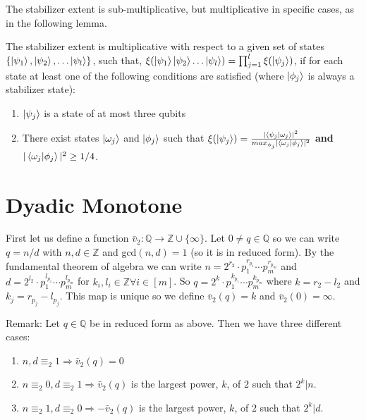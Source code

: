 \documentclass[12pt]{dalthesis}
\begin{document}
The stabilizer extent is sub-multiplicative, but multiplicative in specific cases, as in the following lemma.

\begin{lemma}
\label{stabextent}
The stabilizer extent is multiplicative with respect to a given set of states $\{ \ket{\psi_1}, \ket{\psi_2}, \dots \ket{\psi_l} \}$, such that, $\xi (\ket{\psi_1}\ket{\psi_2} \dots \ket{\psi_l}) = \prod_{j=1}^l \xi (\ket{\psi_j})$, if for each state at least one of the following conditions are satisfied (where $\ket{\phi_j}$ is always a stabilizer state):
\begin{enumerate}
\item $\ket{\psi_j}$ is a state of at most three qubits
\item There exist states $\ket{\omega_j}$ and $\ket{\phi_j}$ such that $\xi (\ket{\psi_j}) = \frac{|\braket{\psi_j| \omega_j}|^2}{max_{\phi_j}|\braket{\omega_j |\phi_j}|^2}$ \textbf{and} $|\braket{\omega_j | \phi_j}|^2 \geq 1/4$.
\end{enumerate}
\end{lemma}

\section{Dyadic Monotone}
First let us define a function $\bar{v}_2 :\mathbb{Q} \rightarrow \mathbb{Z} \cup \{ \infty \}$. Let $0 \neq q \in \mathbb{Q}$ so we can write $q = n/d$ with $n, d \in \mathbb{Z}$ and gcd$(n, d) = 1$ (so it is in reduced form). By the fundamental theorem of algebra we can write $n = 2^{r_2} \cdot p^{r_{p_1}}_1 \cdots p^{r_{p_m}}_m$ and $d = 2^{l_2} \cdot p^{l_{p_1}}_1 \cdots p^{l_{p_m}}_m$ for $k_i, l_i \in \mathbb{Z} \forall i \in [m]$. So $q = 2^{k} \cdot p^{k_{p_1}}_1 \cdots p^{k_{p_m}}_m$ where $k = r_2 - l_2$ and $k_j = r_{p_j} - l_{p_j}$. This map is unique so we define $\bar{v}_2(q) = k$ and $\bar{v}_2(0) = \infty$.

Remark: Let $q \in \mathbb{Q}$ be in reduced form as above. Then we have three different cases:
\begin{enumerate}
\item $n, d \equiv_2 1 \Rightarrow \bar{v}_2(q)= 0$
\item $n \equiv_2 0, d \equiv_2 1 \Rightarrow \bar{v}_2(q)$ is the largest power, $k$, of $2$ such that $2^k|n$.
\item $n \equiv_2 1, d \equiv_2 0 \Rightarrow -\bar{v}_2(q)$ is the largest power, $k$, of $2$ such that $2^k|d$.
\end{enumerate}
\end{document}
